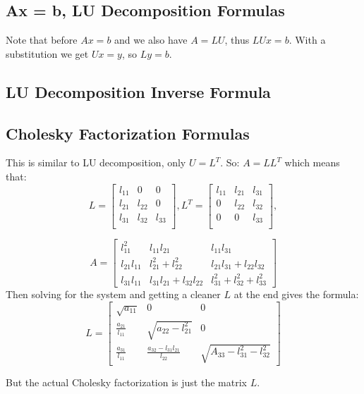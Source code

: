 \subsection*{Ax = b, LU Decomposition Formulas}
Note that before $Ax = b$ and we also have $A = LU$, thus $LUx = b$. With a
substitution we get $Ux = y$, so $Ly = b$.

\subsection*{LU Decomposition Inverse Formula}


\subsection*{Cholesky Factorization Formulas}
This is similar to LU decomposition, only $U = L^T$. So: $A = L L^T$ which means
that:
\[
L =
\begin{bmatrix}
  l_{11} & 0 & 0 \\
  l_{21} & l_{22} & 0 \\
  l_{31} & l_{32} & l_{33} \\
\end{bmatrix},
L^T =
\begin{bmatrix}
  l_{11} & l_{21} & l_{31} \\
  0 & l_{22} & l_{32} \\
  0 & 0 & l_{33} \\
\end{bmatrix},
\]

\[
A =
\begin{bmatrix}
  l_{11}^2 & l_{11}l_{21} & l_{11}l_{31} \\
  l_{21}l_{11} & l_{21}^2 + l_{22}^2 & l_{21}l_{31} + l_{22}l_{32}\\
  l_{31}l_{11} & l_{31}l_{21} + l_{32}l_{22} & l_{31}^2 + l_{32}^2 + l_{33}^2
\end{bmatrix}
\]
Then solving for the system and getting a cleaner $L$ at the end gives the formula:
\[
L =
\begin{bmatrix}
\sqrt{a_{11}} & 0 & 0 \\
\frac{a_{21}}{l_{11}} & \sqrt{a_{22} - l_{21}^2} & 0 \\
\frac{a_{31}}{l_{11}} & \frac{a_{32} - l_{31}l_{21}}{l_{22}} & \sqrt{A_{33} - l_{31}^2 - l_{32}^2}
\end{bmatrix}
\]

But the actual Cholesky factorization is just the matrix $L$.
